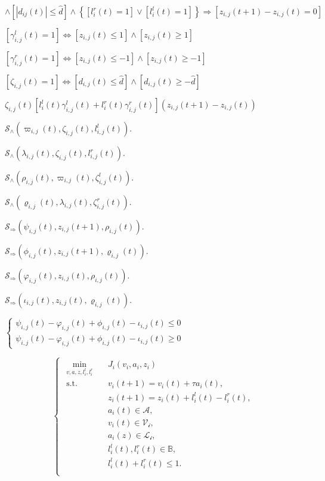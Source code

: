 \begin{equation}
[\left |z_{i,j}(t)  \right |=1] \wedge [\left | d_{ij}(t) \right | \leq \hat{d}] \wedge \left \{ [l_i^r(t)=1] \vee[l_i^l(t)=1] \right \}\Rightarrow [z_{i,j}(t+1)-z_{i,j}(t)=0]
\end{equation}


$[\gamma^l _{i,j}(t) = 1] \Leftrightarrow [z_{i,j}(t) \leq 1] \wedge [z_{i,j}(t) \geq 1]$

$[\gamma^r_{i,j}(t) = 1] \Leftrightarrow [z_{i,j}(t) \leq -1] \wedge [z_{i,j}(t) \geq -1]$

$[\zeta_{i,j}(t) = 1] \Leftrightarrow [d_{i,j}(t) \leq \hat{d}] \wedge [d_{i,j}(t) \geq -\hat{d}]
$

$\zeta_{i,j}(t)[l^l_i(t)\gamma^l_{i,j}(t) + l^r_i(t)\gamma^r_{i,j}(t) ](z_{i,j}(t+1)-z_{i,j}(t))$


$\mathcal{S}_\wedge (\varpi_{i,j}(t),\zeta_{i,j}(t),l^l_{i,j}(t)).$

$\mathcal{S}_\wedge (\lambda_{i,j}(t),\zeta_{i,j}(t),l^r_{i,j}(t)).$


$\mathcal{S}_\wedge (\rho _{i,j}(t),\varpi_{i,j}(t),\zeta^l_{i,j}(t)).$

$\mathcal{S}_\wedge(\varrho_{i,j}(t),\lambda_{i,j}(t),\zeta^r_{i,j}(t)).$

$\mathcal{S}_\Rightarrow (\psi_{i,j}(t),z_{i,j}(t+1),\rho_{i,j}(t)).$

$\mathcal{S}_\Rightarrow (\phi_{i,j}(t),z_{i,j}(t+1),\varrho_{i,j}(t)).$

$\mathcal{S}_\Rightarrow (\varphi_{i,j}(t),z_{i,j}(t),\rho_{i,j}(t)).$

$\mathcal{S}_\Rightarrow (\iota_{i,j}(t),z_{i,j}(t),\varrho_{i,j}(t)).$

$\left\{\begin{matrix}
\psi_{i,j}(t) - \varphi_{i,j}(t) + \phi_{i,j}(t) - \iota_{i,j}(t) \leq 0\\ 
\psi_{i,j}(t) - \varphi_{i,j}(t) + \phi_{i,j}(t) - \iota_{i,j}(t) \geq 0
\end{matrix}\right.$


\begin{equation}

\left\{\begin{matrix}
\begin{aligned}
\min_{v,a,z, l_i^l,l_i^r} \quad & J_i\left ( v_i, a_i, z_i \right )\\
\textrm{s.t.} \quad & v_i(t+1) = v_i(t)+\tau a_i(t),\\
  &   z_i(t+1) = z_i(t) + l_i^l(t) - l_i^r(t),   \\
& a_i(t) \in \mathcal{A} ,  \\
& v_i(t) \in \mathcal{V_i} ,  \\
& a_i(z) \in \mathcal{L_i} ,  \\
&  l_i^l(t),l_i^r(t)\in \mathbb{B},   \\
& l_i^l(t) + l_i^r(t)  \leq 1.\\
\end{aligned}
\end{matrix}\right.

\end{equation}


